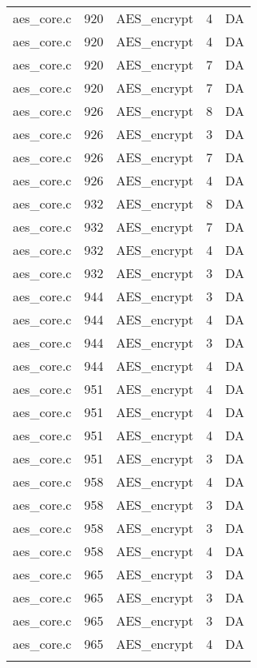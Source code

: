 \begin{table}[h]
{\begin{tabular}{clrrr}
aes\_core.c&920&AES\_encrypt&4 &DA\\
aes\_core.c&920&AES\_encrypt&4 &DA\\
aes\_core.c&920&AES\_encrypt&7 &DA\\
aes\_core.c&920&AES\_encrypt&7 &DA\\
aes\_core.c&926&AES\_encrypt&8 &DA\\
aes\_core.c&926&AES\_encrypt&3 &DA\\
aes\_core.c&926&AES\_encrypt&7 &DA\\
aes\_core.c&926&AES\_encrypt&4 &DA\\
aes\_core.c&932&AES\_encrypt&8 &DA\\
aes\_core.c&932&AES\_encrypt&7 &DA\\
aes\_core.c&932&AES\_encrypt&4 &DA\\
aes\_core.c&932&AES\_encrypt&3 &DA\\
aes\_core.c&944&AES\_encrypt&3 &DA\\
aes\_core.c&944&AES\_encrypt&4 &DA\\
aes\_core.c&944&AES\_encrypt&3 &DA\\
aes\_core.c&944&AES\_encrypt&4 &DA\\
aes\_core.c&951&AES\_encrypt&4 &DA\\
aes\_core.c&951&AES\_encrypt&4 &DA\\
aes\_core.c&951&AES\_encrypt&4 &DA\\
aes\_core.c&951&AES\_encrypt&3 &DA\\
aes\_core.c&958&AES\_encrypt&4 &DA\\
aes\_core.c&958&AES\_encrypt&3 &DA\\
aes\_core.c&958&AES\_encrypt&3 &DA\\
aes\_core.c&958&AES\_encrypt&4 &DA\\
aes\_core.c&965&AES\_encrypt&3 &DA\\
aes\_core.c&965&AES\_encrypt&3 &DA\\
aes\_core.c&965&AES\_encrypt&3 &DA\\
aes\_core.c&965&AES\_encrypt&4 &DA\\
&&&&\\
\hline
\end{tabular}
}
\end{table}